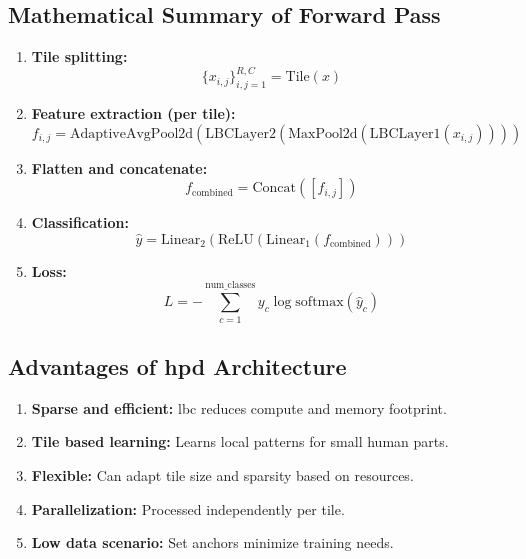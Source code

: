 \subsection*{Mathematical Summary of Forward Pass}
\begin{enumerate}
    \item \textbf{Tile splitting:}
    \begin{equation}
    \{x_{i,j}\}_{i,j=1}^{R,C} = \text{Tile}(x)
    \end{equation}
    \item \textbf{Feature extraction (per tile):}
    \begin{equation}
    f_{i,j} = \text{AdaptiveAvgPool2d}(\text{LBCLayer2}(\text{MaxPool2d}(\text{LBCLayer1}(x_{i,j}))))
    \end{equation}
    \item \textbf{Flatten and concatenate:}
    \begin{equation}
    f_{\text{combined}} = \text{Concat}([f_{i,j}])
    \end{equation}
    \item \textbf{Classification:}
    \begin{equation}
    \hat{y} = \text{Linear}_2(\text{ReLU}(\text{Linear}_1(f_{\text{combined}})))
    \end{equation}
    \item \textbf{Loss:}
    \begin{equation}
    L = -\sum_{c=1}^{\text{num\_classes}} y_c \log \text{softmax}(\hat{y}_c)
    \end{equation}
\end{enumerate}

\subsection*{Advantages of \gls{hpd} Architecture}
\begin{enumerate}
    \item \textbf{Sparse and efficient:} \gls{lbc} reduces compute and memory footprint.
    \item \textbf{Tile based learning:} Learns local patterns for small human parts.
    \item \textbf{Flexible:} Can adapt tile size and sparsity based on resources.
    \item \textbf{Parallelization:} Processed independently per tile.
    \item \textbf{Low data scenario:} Set anchors minimize training needs.
\end{enumerate}
